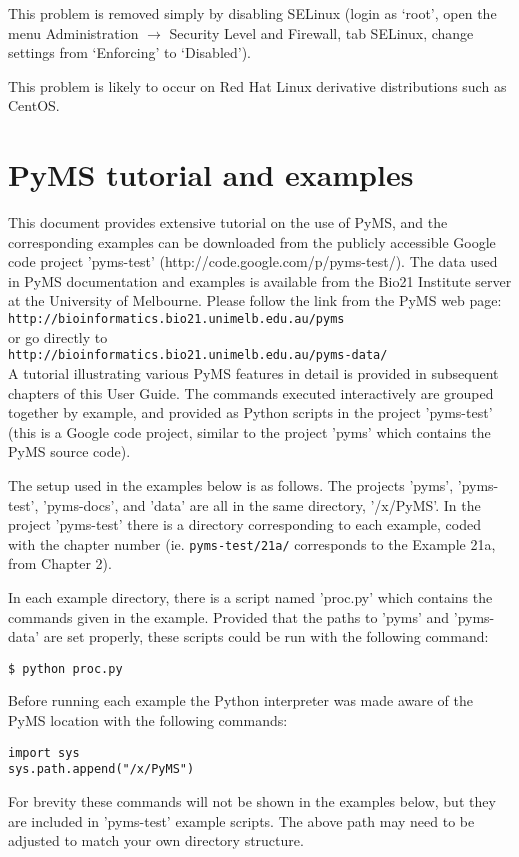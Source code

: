 This problem is removed simply by disabling SELinux (login as `root', open the
menu Administration $\rightarrow$ Security Level and Firewall, tab SELinux,
change settings from `Enforcing' to `Disabled').

This problem is likely to occur on Red Hat Linux derivative distributions such
as CentOS.

\section{PyMS tutorial and examples}

This document provides extensive tutorial on the use of PyMS, and the
corresponding examples can be downloaded from the publicly accessible
Google code project 'pyms-test' (http://code.google.com/p/pyms-test/). 
The data used in PyMS documentation and examples is available from the
Bio21 Institute server at the University of Melbourne. Please follow
the link from the PyMS web page:\\
{\tt http://bioinformatics.bio21.unimelb.edu.au/pyms}\\
or go directly to\\
{\tt http://bioinformatics.bio21.unimelb.edu.au/pyms-data/}\\

A tutorial illustrating various PyMS features in detail is provided
in subsequent chapters of this User Guide. The commands executed
interactively are grouped together by example, and provided as
Python scripts in the project 'pyms-test' (this is a Google code
project, similar to the project 'pyms' which contains the PyMS
source code).

The setup used in the examples below is as follows. The projects 'pyms',
'pyms-test', 'pyms-docs', and 'data' are all in the same directory,
'/x/PyMS'. In the project 'pyms-test' there is a directory corresponding
to each example, coded with the chapter number (ie. {\tt pyms-test/21a/}
corresponds to the Example 21a, from Chapter 2).

In each example directory, there is a script named 'proc.py' which
contains the commands given in the example.  Provided that the paths
to 'pyms' and 'pyms-data' are set properly, these scripts could be
run with the following command:

\begin{verbatim}
$ python proc.py
\end{verbatim}

Before running each example the Python interpreter was made aware of
the PyMS location with the following commands:

\begin{verbatim}
import sys
sys.path.append("/x/PyMS")
\end{verbatim}

For brevity these commands will not be shown in the examples below,
but they are included in 'pyms-test' example scripts.  The above
path may need to be adjusted to match your own directory structure.


